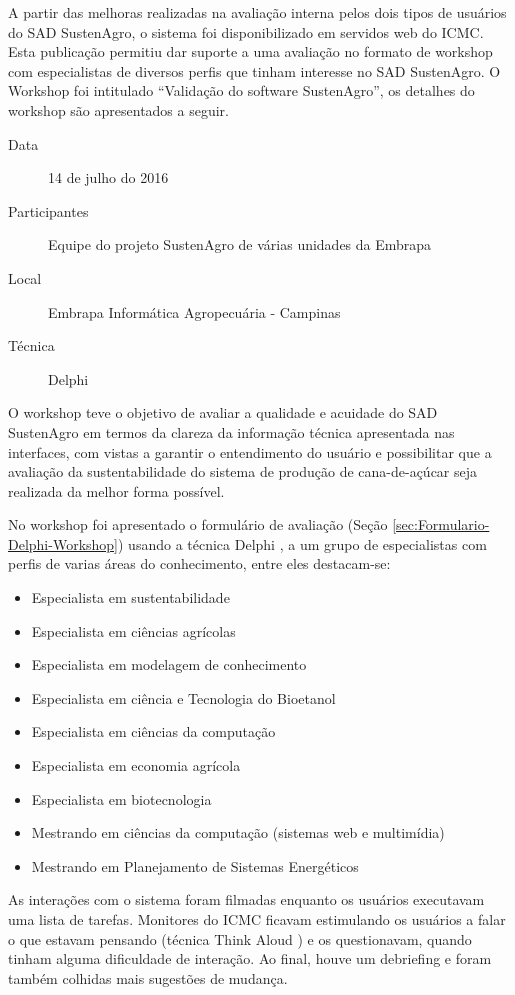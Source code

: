 %
A partir das melhoras realizadas na avaliação interna pelos dois tipos
de usuários do SAD SustenAgro, o sistema foi disponibilizado em servidos
web do ICMC. Esta publicação permitiu dar suporte a uma avaliação
no formato de \foreignlanguage{english}{workshop} com especialistas
de diversos perfis que tinham interesse no SAD SustenAgro. O \foreignlanguage{english}{Workshop}
foi intitulado ``Validação do software SustenAgro'', os detalhes
do \foreignlanguage{english}{workshop} são apresentados a seguir.
\begin{description}
\item [{Data}] 14 de julho do 2016
\item [{Participantes}] Equipe do projeto SustenAgro de várias unidades
da Embrapa
\item [{Local}] Embrapa Informática Agropecuária - Campinas
\item [{Técnica}] Delphi
\end{description}
O \foreignlanguage{english}{workshop} teve o objetivo de avaliar a
qualidade e acuidade do SAD SustenAgro em termos da clareza da informação
técnica apresentada nas interfaces, com vistas a garantir o entendimento
do usuário e possibilitar que a avaliação da sustentabilidade do sistema
de produção de cana-de-açúcar seja realizada da melhor forma possível. 

No \foreignlanguage{english}{workshop} foi apresentado o formulário
de avaliação (Seção \ref{sec:Formulario-Delphi-Workshop}) usando
a técnica \foreignlanguage{english}{Delphi} \citep{wright1985tecnica},
a um grupo de especialistas com perfis de varias áreas do conhecimento,
entre eles destacam-se:
\begin{itemize}
\item Especialista em sustentabilidade
\item Especialista em ciências agrícolas
\item Especialista em modelagem de conhecimento
\item Especialista em ciência e Tecnologia do Bioetanol
\item Especialista em ciências da computação
\item Especialista em economia agrícola
\item Especialista em biotecnologia
\item Mestrando em ciências da computação (sistemas web e multimídia)
\item Mestrando em Planejamento de Sistemas Energéticos
\end{itemize}
As interações com o sistema foram filmadas enquanto os usuários executavam
uma lista de tarefas. Monitores do ICMC ficavam estimulando os usuários
a falar o que estavam pensando (técnica Think Aloud ) e os questionavam,
quando tinham alguma dificuldade de interação. Ao final, houve um
\foreignlanguage{english}{debriefing} e foram também colhidas mais
sugestões de mudança. 

